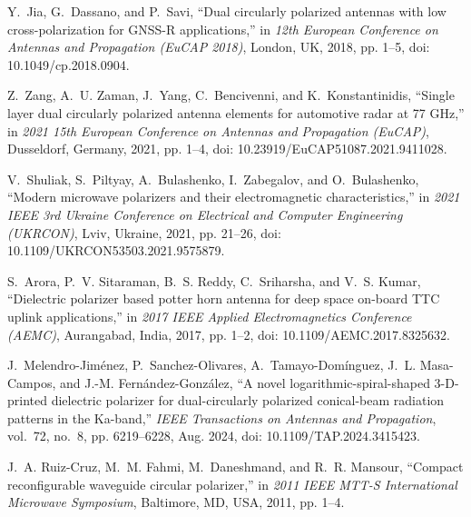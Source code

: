 \documentclass[journal,9pt]{IEEEtran}
\begin{document}
\begin{thebibliography}{99}
    
    Y.~Jia, G.~Dassano, and P.~Savi, ``Dual circularly polarized antennas with low cross-polarization for GNSS-R applications,'' in \emph{12th European Conference on Antennas and Propagation (EuCAP 2018)}, London, UK, 2018, pp. 1--5, doi: 10.1049/cp.2018.0904.

    Z.~Zang, A.~U. Zaman, J.~Yang, C.~Bencivenni, and K.~Konstantinidis, ``Single layer dual circularly polarized antenna elements for automotive radar at 77 GHz,'' in \emph{2021 15th European Conference on Antennas and Propagation (EuCAP)}, Dusseldorf, Germany, 2021, pp. 1--4, doi: 10.23919/EuCAP51087.2021.9411028.

    V.~Shuliak, S.~Piltyay, A.~Bulashenko, I.~Zabegalov, and O.~Bulashenko, ``Modern microwave polarizers and their electromagnetic characteristics,'' in \emph{2021 IEEE 3rd Ukraine Conference on Electrical and Computer Engineering (UKRCON)}, Lviv, Ukraine, 2021, pp. 21--26, doi: 10.1109/UKRCON53503.2021.9575879.

    S.~Arora, P.~V. Sitaraman, B.~S. Reddy, C.~Sriharsha, and V.~S. Kumar, ``Dielectric polarizer based potter horn antenna for deep space on-board TTC uplink applications,'' in \emph{2017 IEEE Applied Electromagnetics Conference (AEMC)}, Aurangabad, India, 2017, pp. 1--2, doi: 10.1109/AEMC.2017.8325632.

    J.~Melendro-Jiménez, P.~Sanchez-Olivares, A.~Tamayo-Domínguez, J.~L. Masa-Campos, and J.-M. Fernández-González, ``A novel logarithmic-spiral-shaped 3-D-printed dielectric polarizer for dual-circularly polarized conical-beam radiation patterns in the Ka-band,'' \emph{IEEE Transactions on Antennas and Propagation}, vol.~72, no.~8, pp. 6219--6228, Aug. 2024, doi: 10.1109/TAP.2024.3415423.

    J.~A. Ruiz-Cruz, M.~M. Fahmi, M.~Daneshmand, and R.~R. Mansour, ``Compact reconfigurable waveguide circular polarizer,'' in \emph{2011 IEEE MTT-S International Microwave Symposium}, Baltimore, MD, USA, 2011, pp. 1--4.


\end{thebibliography}
\end{document}
